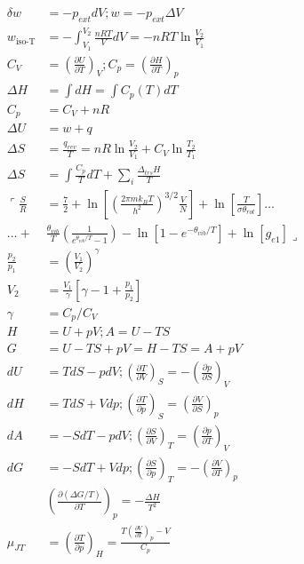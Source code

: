 \begin{align*}
\delta w&=-p_{ext}dV; w=-p_{ext}\Delta V\\
w_{\textrm{iso-T}}&=-\int_{V_1}^{V_2}\frac{nRT}{V}dV=-nRT\ln\frac{V_2}{V_1}\\
C_V&=\left(\frac{\partial U}{\partial T}\right)_V; C_p=\left(\frac{\partial H}{\partial T}\right)_p\\
\Delta H &= \int dH=\int C_p(T)dT\\
C_p&=C_V+nR\\
\Delta U &= w + q\\
\Delta S &= \frac{q_{rev}}{T}= nR\ln \frac{V_2}{V_1} + C_V \ln \frac{T_2}{T_1}\\
\Delta S &= \int \frac{C_p}{T} dT + \sum_i\frac{\Delta_{trs} H}{T}\\
\ulcorner \frac{S}{R}&=\frac{7}{2}+\ln {\left[ \left( \frac{2\pi m k_B T}{h^2}\right)^{3/2}\frac{V}{N}\right]} + \ln {\left[ \frac{T}{\sigma \theta_{rot}}\right]}\ldots\\
\ldots + &\frac{\theta_{vib}}{T}\left(\frac{1}{e^{\theta_{vib}/T}-1}\right) - \ln{\left[ 1-e^{-\theta_{vib}/T}\right]} + \ln{\left[ g_{e1}\right]}\lrcorner\\
\frac{p_2}{p_1}&=\left(\frac{V_1}{V_2}\right)^{\gamma}\\
V_2&=\frac{V_1}{\gamma}\left[\gamma -1 +\frac{p_1}{p_2}\right]\\
\gamma&=C_p/C_V\\
H &= U + pV; A = U - TS\\
G& = U - TS + pV = H -TS = A + pV\\
dU&=TdS-pdV; \left(\frac{\partial T}{\partial V}\right)_S = -\left(\frac{\partial p}{\partial S}\right)_V\\
dH&=TdS+Vdp; \left(\frac{\partial T}{\partial p}\right)_S = \left(\frac{\partial V}{\partial S}\right)_p\\
dA&=-SdT-pdV; \left(\frac{\partial S}{\partial V}\right)_T = \left(\frac{\partial p}{\partial T}\right)_V\\
dG&=-SdT+Vdp; \left(\frac{\partial S}{\partial p}\right)_T = -\left(\frac{\partial V}{\partial T}\right)_p\\
&\left(\frac{\partial \left(\Delta G/T\right)}{\partial T}\right)_{p}=-\frac{\Delta H}{T^2}\\
\mu_{JT}&=\left( \frac{\partial T}{\partial p}\right)_H=\frac{T\left(\frac{\partial V}{\partial T}\right)_p -V}{C_p}\\
\end{align*}